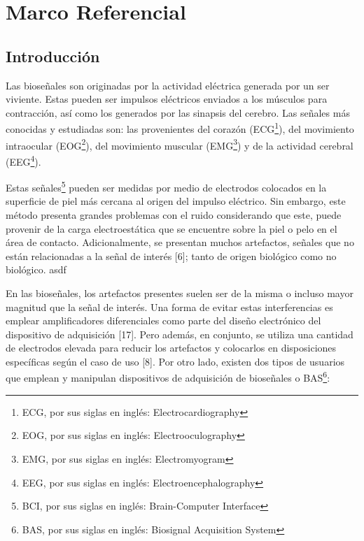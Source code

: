 \chapter{Marco Referencial}

\section{Introducción}
\label{sec:orga059c5a}
Las bioseñales son originadas por la actividad eléctrica generada por un ser viviente. Estas pueden ser impulsos eléctricos enviados a los músculos para contracción, así como los generados por las sinapsis del cerebro. Las señales más conocidas y estudiadas son: las provenientes del corazón (ECG\footnote{ECG, por sus siglas en inglés: Electrocardiography}), del movimiento intraocular (EOG\footnote{EOG, por sus siglas en inglés: Electrooculography}), del movimiento muscular (EMG\footnote{EMG, por sus siglas en inglés: Electromyogram}) y de la actividad cerebral (EEG\footnote{EEG, por sus siglas en inglés: Electroencephalography}).

Estas señales\footnote{BCI, por sus siglas en inglés: Brain-Computer Interface\label{org2010a5c}} pueden ser medidas por medio de electrodos colocados en la superficie de piel más cercana al origen del impulso eléctrico. Sin embargo, este método presenta grandes problemas con el ruido considerando que este, puede provenir de la carga electroestática que se encuentre sobre la piel o pelo en el área de contacto. Adicionalmente, se presentan muchos artefactos, señales que no están relacionadas a la señal de interés \cite{I.R.KeckV.FischerC.G.Puntonet2011} [6]; tanto de origen biológico como no biológico.
asdf

En las bioseñales, los artefactos presentes suelen ser de la misma o incluso mayor magnitud que la señal de interés. Una forma de evitar estas interferencias es emplear amplificadores diferenciales como parte del diseño electrónico del dispositivo de adquisición [17]. Pero además, en conjunto, se utiliza una cantidad de electrodos elevada para reducir los artefactos y colocarlos en disposiciones específicas según el caso de uso [8].
Por otro lado, existen dos tipos de usuarios que emplean y manipulan dispositivos de adquisición de bioseñales o BAS\footnote{BAS, por sus siglas en inglés: Biosignal Acquisition System}:

